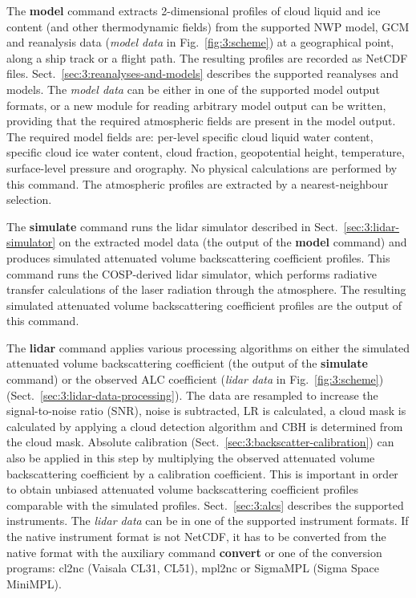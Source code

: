 The \textbf{model}
command extracts 2-dimensional profiles of cloud liquid and ice content
(and other thermodynamic fields) from the supported NWP model, GCM and
reanalysis data (\textit{model data} in Fig.~\ref{fig:3:scheme}) at a geographical point, along a ship track or a flight path.
The resulting profiles are recorded as NetCDF files. Sect.~\ref{sec:3:reanalyses-and-models}
describes the supported reanalyses and models. The \textit{model data} can
be either in one of the supported model output formats,
or a new module for reading arbitrary model output can be written,
providing that the required atmospheric fields are present in the model output.
The required model fields are: per-level specific cloud liquid water content,
specific cloud ice water content, cloud fraction, geopotential height, temperature,
surface-level pressure and orography. No physical calculations are performed
by this command. The atmospheric profiles are extracted by a nearest-neighbour
selection.

The \textbf{simulate} command runs the lidar simulator described in Sect.~\ref{sec:3:lidar-simulator}
on the extracted model data (the output of the \textbf{model} command) and produces simulated attenuated volume backscattering coefficient profiles. This command runs the COSP-derived lidar simulator, which performs
radiative transfer calculations of the laser radiation through the atmosphere.
The resulting simulated attenuated volume backscattering coefficient profiles are the output of this command.

The \textbf{lidar} command applies various processing algorithms on either
the simulated attenuated volume backscattering coefficient (the output of the \textbf{simulate} command)
or the observed ALC coefficient (\textit{lidar data} in Fig.~\ref{fig:3:scheme})
(Sect.~\ref{sec:3:lidar-data-processing}). The data are resampled
to increase the signal-to-noise ratio (SNR), noise is subtracted, LR is calculated,
a cloud mask is calculated by applying a cloud detection algorithm and CBH is determined
from the cloud mask. Absolute calibration (Sect.~\ref{sec:3:backscatter-calibration})
can also be applied in this step by
multiplying the observed attenuated volume backscattering coefficient by a calibration coefficient. This is
important in order to obtain unbiased attenuated volume backscattering coefficient profiles comparable with the simulated profiles. Sect.~\ref{sec:3:alcs} describes the supported instruments.
The \textit{lidar data} can be in one of the supported instrument formats. If
the native instrument format is not NetCDF, it has to be converted from the native
format with the auxiliary command \textbf{convert} or one of the conversion
programs: cl2nc (Vaisala CL31, CL51), mpl2nc or SigmaMPL (Sigma Space MiniMPL).

